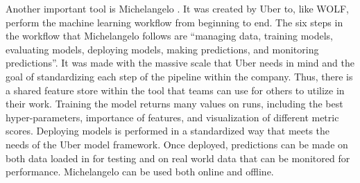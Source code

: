 Another important tool is Michelangelo \parencite{michelangelo}. It was created by Uber to, like WOLF, perform the machine learning workflow from beginning to end. The six steps in the workflow that Michelangelo follows are ``managing data, training models, evaluating models, deploying models, making predictions, and monitoring predictions''. It was made with the massive scale that Uber needs in mind and the goal of standardizing each step of the pipeline within the company. Thus, there is a shared feature store within the tool that teams can use for others to utilize in their work. Training the model returns many values on runs, including the best hyper-parameters, importance of features, and visualization of different metric scores. Deploying models is performed in a standardized way that meets the needs of the Uber model framework. Once deployed, predictions can be made on both data loaded in for testing and on real world data that can be monitored for performance. Michelangelo can be used both online and offline.